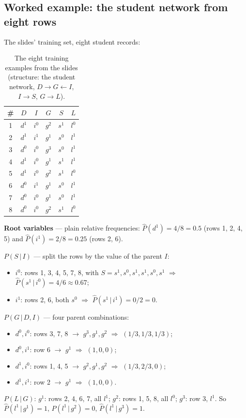 \documentclass[11pt, oneside]{book}
\newcommand{\Prob}{\mathbb{P}}           %
\newcommand{\given}{\,\vert\,}           %
\let\originalsubsection\subsection
\renewcommand{\subsection}{\Needspace{6\baselineskip}\originalsubsection}
\begin{document}
\subsection{Worked example: the student network from eight rows}
\label{sec:ml-student}

The slides' training set, eight student records:

\begin{table}[htbp]
\centering
\small
\begin{tabular}{@{}cccccc@{}}
\toprule
\# & $D$ & $I$ & $G$ & $S$ & $L$ \\
\midrule
1 & $d^1$ & $i^0$ & $g^2$ & $s^1$ & $l^0$ \\
2 & $d^1$ & $i^1$ & $g^1$ & $s^0$ & $l^1$ \\
3 & $d^0$ & $i^0$ & $g^3$ & $s^0$ & $l^1$ \\
4 & $d^1$ & $i^0$ & $g^1$ & $s^1$ & $l^1$ \\
5 & $d^1$ & $i^0$ & $g^2$ & $s^1$ & $l^0$ \\
6 & $d^0$ & $i^1$ & $g^1$ & $s^0$ & $l^1$ \\
7 & $d^0$ & $i^0$ & $g^1$ & $s^0$ & $l^1$ \\
8 & $d^0$ & $i^0$ & $g^2$ & $s^1$ & $l^0$ \\
\bottomrule
\end{tabular}
\caption{The eight training examples from the slides (structure: the student
network, $D \to G \leftarrow I$, $I \to S$, $G \to L$).}
\label{tab:student-rows}
\end{table}

\begin{exbox}[title={Counting the CPDs}]
\textbf{Root variables} --- plain relative frequencies:
$\hat P(d^1) = 4/8 = 0.5$ (rows 1, 2, 4, 5) and $\hat P(i^1) = 2/8 = 0.25$
(rows 2, 6).\par\smallskip
\textbf{$P(S \given I)$} --- split the rows by the value of the parent $I$:
\begin{itemize}
  \item $i^0$: rows 1, 3, 4, 5, 7, 8, with $S = s^1, s^0, s^1, s^1, s^0, s^1$
    $\Rightarrow$ $\hat P(s^1 \given i^0) = 4/6 \approx 0.67$;
  \item $i^1$: rows 2, 6, both $s^0$ $\Rightarrow$ $\hat P(s^1 \given i^1) = 0/2 = 0$.
\end{itemize}
\textbf{$P(G \given D, I)$} --- four parent combinations:
\begin{itemize}
  \item $d^0, i^0$: rows 3, 7, 8 $\to$ $g^3, g^1, g^2$ $\Rightarrow$ $(1/3, 1/3, 1/3)$;
  \item $d^0, i^1$: row 6 $\to$ $g^1$ $\Rightarrow$ $(1, 0, 0)$;
  \item $d^1, i^0$: rows 1, 4, 5 $\to$ $g^2, g^1, g^2$ $\Rightarrow$ $(1/3, 2/3, 0)$;
  \item $d^1, i^1$: row 2 $\to$ $g^1$ $\Rightarrow$ $(1, 0, 0)$.
\end{itemize}
\textbf{$P(L \given G)$}: $g^1$: rows 2, 4, 6, 7, all $l^1$; $g^2$: rows 1, 5, 8,
all $l^0$; $g^3$: row 3, $l^1$. So $\hat P(l^1 \given g^1) = 1$,
$\hat P(l^1 \given g^2) = 0$, $\hat P(l^1 \given g^3) = 1$.
\end{exbox}
\end{document}
